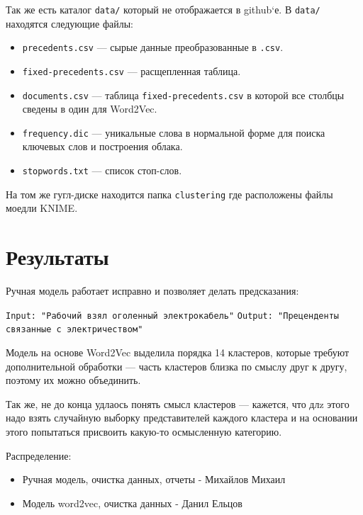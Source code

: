 \documentclass{article}
\begin{document}
Так же есть каталог \texttt{data/} который не отображается в github`е.
В \texttt{data/} находятся следующие файлы:
\begin{itemize}
    \item \texttt{precedents.csv} --- сырые данные преобразованные в \texttt{.csv}.
    \item \texttt{fixed-precedents.csv} --- расщепленная таблица. 
    \item \texttt{documents.csv} --- таблица \texttt{fixed-precedents.csv} в которой все столбцы сведены в один для Word2Vec.
    \item \texttt{frequency.dic} --- уникальные слова в нормальной форме для поиска ключевых слов и построения облака.  
    \item \texttt{stopwords.txt} --- список стоп-слов.
\end{itemize}

На том же гугл-диске находится папка \texttt{clustering} где расположены файлы моедли KNIME. 

\section{Результаты}

Ручная модель работает исправно и позволяет делать предсказания:

\texttt{Input: "Рабочий взял оголенный электрокабель"}
\texttt{Output: "Преценденты связанные с электричеством"}

Модель на основе Word2Vec выделила порядка 14 кластеров, которые требуют дополнительной обработки --- часть кластеров близка по смыслу друг к другу, поэтому их можно объединить. 

Так же, не до конца удлаось понять смысл кластеров --- кажется, что длz этого надо взять случайную выборку представителей каждого кластера и на основании этого попытаться присвоить какую-то осмысленную категорию. 

Распределение:
\begin{itemize}
    \item Ручная модель, очистка данных, отчеты - Михайлов Михаил
    \item Модель word2vec, очистка данных - Данил Ельцов
\end{itemize}
\end{document}
